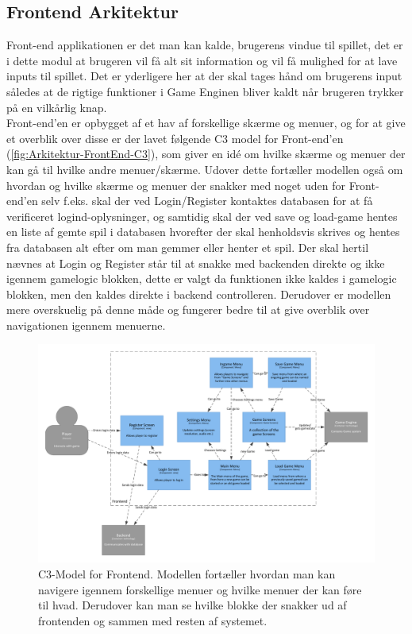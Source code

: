 \subsection{Frontend Arkitektur}

Front-end applikationen er det man kan kalde, brugerens vindue til spillet, det er i dette modul at brugeren vil få alt sit information og vil få mulighed for at lave inputs til spillet. Det er yderligere her at der skal tages hånd om brugerens input således at de rigtige funktioner i Game Enginen bliver kaldt når brugeren trykker på en vilkårlig knap.\\
Front-end'en er opbygget af et hav af forskellige skærme og menuer, og for at give et overblik over disse er der lavet følgende C3 model for Front-end'en (\autoref{fig:Arkitektur-FrontEnd-C3}), som giver en idé om hvilke skærme og menuer der kan gå til hvilke andre menuer/skærme. Udover dette fortæller modellen også om hvordan og hvilke skærme og menuer der snakker med noget uden for Front-end'en selv f.eks. skal der ved Login/Register kontaktes databasen for at få verificeret logind-oplysninger, og samtidig skal der ved save og load-game hentes en liste af gemte spil i databasen hvorefter der skal henholdsvis skrives og hentes fra databasen alt efter om man gemmer eller henter et spil. Der skal hertil nævnes at Login og Register står til at snakke med backenden direkte og ikke igennem gamelogic blokken, dette er valgt da funktionen ikke kaldes i gamelogic blokken, men den kaldes direkte i backend controlleren. Derudover er modellen mere overskuelig på denne måde og fungerer bedre til at give overblik over navigationen igennem menuerne.

\begin{figure}[H]
\centering
\includegraphics[width = \textwidth]{02-Body/Images/Frontend_C3.pdf}
\caption{C3-Model for Frontend. Modellen fortæller hvordan man kan navigere igennem forskellige menuer og hvilke menuer der kan føre til hvad. Derudover kan man se hvilke blokke der snakker ud af frontenden og sammen med resten af systemet.}
\label{fig:Arkitektur-FrontEnd-C3}
\end{figure}

